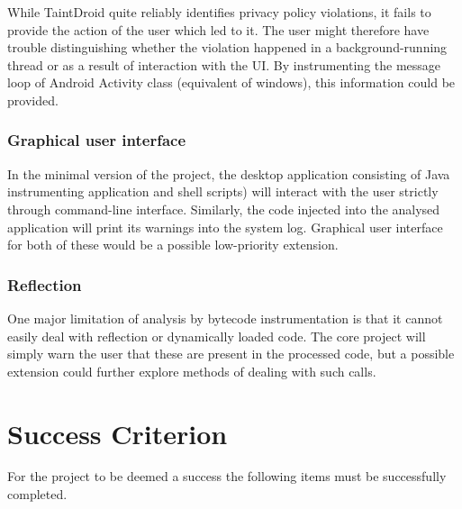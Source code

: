 \documentclass[12pt]{article}
\begin{document}
While TaintDroid quite reliably identifies privacy policy violations,
it fails to provide the action of the user which led to it. The user 
might therefore have trouble distinguishing whether the violation 
happened in a background-running thread or as a result of interaction
with the UI. By instrumenting the message loop of Android Activity class
(equivalent of windows), this information could be provided.

\subsubsection*{Graphical user interface}

In the minimal version of the project, the desktop application consisting of
Java instrumenting application and shell scripts) will interact with the user
strictly through command-line interface. Similarly, the code injected into 
the analysed application will print its warnings into the system log. 
Graphical user interface for both of these would be a possible low-priority 
extension.

\subsubsection*{Reflection}

One major limitation of analysis by bytecode instrumentation is that it 
cannot easily deal with reflection or dynamically loaded code. The core
project will simply warn the user that these are present in the processed
code, but a possible extension could further explore methods of dealing 
with such calls.

\section*{Success Criterion}

For the project to be deemed a success the following items must be
successfully completed.
\end{document}
